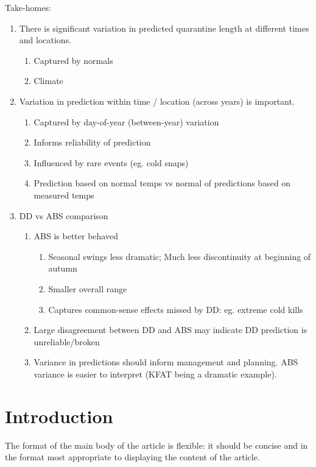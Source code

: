 \documentclass[10pt,a4paper,twocolumn]{article}
\begin{document}
Take-homes:
\begin{enumerate}
\item There is significant variation in predicted quarantine length 
at different times and locations.
  \begin{enumerate}
  \item Captured by normals
  \item Climate
  \end{enumerate}
\item Variation in prediction within time / location (across years) 
is important.
  \begin{enumerate}
  \item Captured by day-of-year (between-year) variation
  \item Informs reliability of prediction
  \item Influenced by rare events (eg. cold snaps)
  \item Prediction based on normal temps vs normal 
  of predictions based on measured temps
  \end{enumerate}
\item DD vs ABS comparison
  \begin{enumerate}
  \item ABS is better behaved
    \begin{enumerate}
    \item Seasonal swings less dramatic; 
    Much less discontinuity at beginning of autumn 
    \item Smaller overall range
    \item Captures common-sense effects missed by DD: 
    eg. extreme cold kills
    \end{enumerate}
  \item Large disagreement between DD and ABS may indicate 
  DD prediction is unreliable/broken
  \item Variance in predictions should inform management and planning.
  ABS variance is easier to interpret (KFAT being a dramatic example).
  \end{enumerate}
\end{enumerate}


\section*{Introduction}

The format of the main body of the article is flexible: it should be concise and in the format most appropriate to displaying the content of the article.
\end{document}
